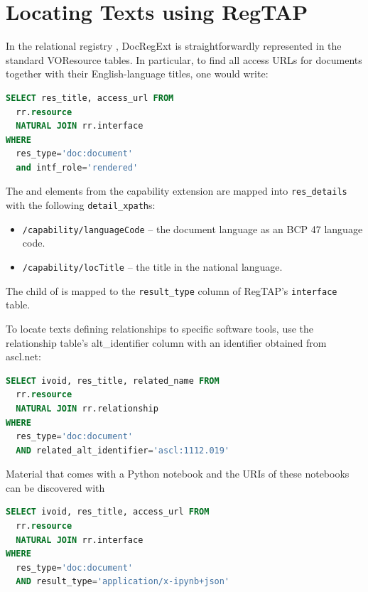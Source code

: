 \documentclass{ivoa}
\begin{document}


\section{Locating Texts using RegTAP}
\label{sect:docregext-regtap}

In the relational registry \citep{2019ivoa.spec.1011D}, DocRegExt is
straightforwardly represented in the standard VOResource tables.  In
particular, to find all access URLs for documents together with their
English-language titles, one would write:

\begin{lstlisting}[language=SQL]
SELECT res_title, access_url FROM
  rr.resource
  NATURAL JOIN rr.interface
WHERE
  res_type='doc:document'
  and intf_role='rendered'
\end{lstlisting}

The  and  elements from the
 capability extension are mapped into
\verb|res_details| with the following \verb|detail_xpath|s:

\begin{itemize}

\item \texttt{/capability/languageCode} -- the document language as an
BCP 47 \citep{std:BCP47} language code.
\item \texttt{/capability/locTitle} -- the title in the national
language.
\end{itemize}

The  child of  is mapped to
the \verb|result_type| column of RegTAP's \verb|interface| table.

To locate texts defining relationships to specific software tools, use
the relationship table's alt\_identifier column with an identifier
obtained from ascl.net:

\begin{lstlisting}[language=SQL]
SELECT ivoid, res_title, related_name FROM
  rr.resource
  NATURAL JOIN rr.relationship
WHERE
  res_type='doc:document'
  AND related_alt_identifier='ascl:1112.019'
\end{lstlisting}

Material that comes with a Python notebook and the URIs of these
notebooks can be discovered with

\begin{lstlisting}[language=SQL]
SELECT ivoid, res_title, access_url FROM
  rr.resource
  NATURAL JOIN rr.interface
WHERE
  res_type='doc:document'
  AND result_type='application/x-ipynb+json'
\end{lstlisting}
\end{document}
